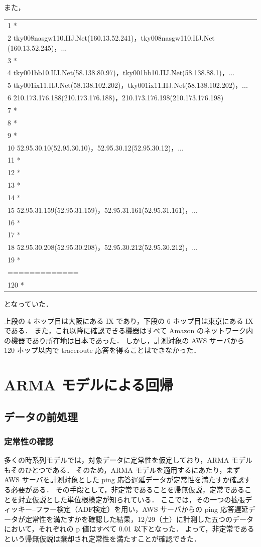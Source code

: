 \documentclass[a4j]{jarticle}
\begin{document}
また，

\begin{table}[H]
\begin{tabular}{l}
 1  *\\
 2  tky008nasgw110.IIJ.Net(160.13.52.241)，tky008nasgw110.IIJ.Net (160.13.52.245)，...\\
 3  *\\
 4  tky001bb10.IIJ.Net(58.138.80.97)，tky001bb10.IIJ.Net(58.138.88.1)，...\\
 5  tky001ix11.IIJ.Net(58.138.102.202)，tky001ix11.IIJ.Net(58.138.102.202)，...\\
 6  210.173.176.188(210.173.176.188)，210.173.176.198(210.173.176.198)\\
 7  *\\
 8  *\\
 9  *\\
10  52.95.30.10(52.95.30.10)，52.95.30.12(52.95.30.12)，...\\
11  *\\
12  *\\
13  *\\
14  *\\
15  52.95.31.159(52.95.31.159)，52.95.31.161(52.95.31.161)，...\\
16  *\\
17  *\\
18  52.95.30.208(52.95.30.208)，52.95.30.212(52.95.30.212)，...\\
19  *\\
=============\\
120  *\\
\end{tabular}
\end{table}
となっていた．

上段の 4 ホップ目は大阪にある IX であり，下段の 6 ホップ目は東京にある IX である．
また，これ以降に確認できる機器はすべて Amazon のネットワーク内の機器であり所在地は日本であった．
しかし，計測対象の AWS サーバから 120 ホップ以内で traceroute 応答を得ることはできなかった．
\section{ARMA モデルによる回帰}
\subsection{データの前処理}
\subsubsection{定常性の確認}
多くの時系列モデルでは，対象データに定常性を仮定しており，ARMA モデルもそのひとつである．
そのため，ARMA モデルを適用するにあたり，まず AWS サーバを計測対象とした ping 応答遅延データが定常性を満たすか確認する必要がある．
その手段として，非定常であることを帰無仮説，定常であることを対立仮説とした単位根検定が知られている．
ここでは，その一つの拡張ディッキー–フラー検定（ADF検定）を用い，AWS サーバからの ping 応答遅延データが定常性を満たすかを確認した結果，12/29（土）に計測した五つのデータにおいて，それぞれの p 値はすべて 0.01 以下となった．
よって，非定常であるという帰無仮説は棄却され定常性を満たすことが確認できた．
\end{document}
